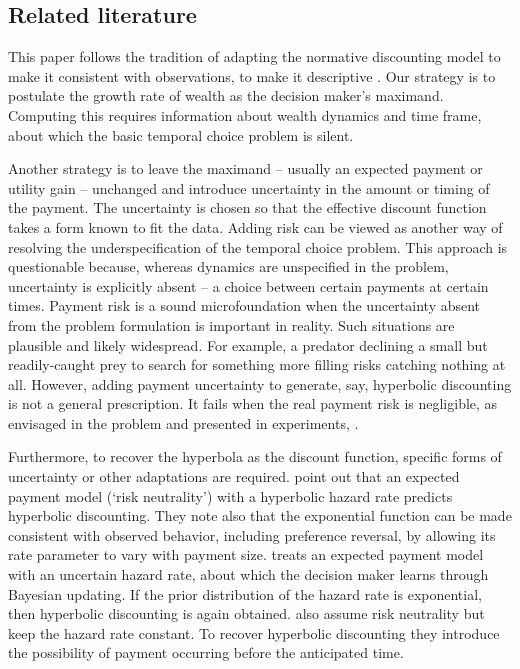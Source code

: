 \subsection{Related literature\label{sec:literature}}

This paper follows the tradition of adapting the normative discounting model to make it consistent with observations, \ie to make it descriptive \citep{Kacelnik1997}. Our strategy is to postulate the growth rate of wealth as the decision maker's maximand. Computing this requires information about wealth dynamics and time frame, about which the basic temporal choice problem is silent.

Another strategy is to leave the maximand -- usually an expected payment or utility gain -- unchanged and introduce uncertainty in the amount or timing of the payment. The uncertainty is chosen so that the effective discount function takes a form known to fit the data. Adding risk can be viewed as another way of resolving the underspecification of the temporal choice problem. This approach is questionable because, whereas dynamics are unspecified in the problem, uncertainty is explicitly absent -- a choice between certain payments at certain times. Payment risk is a sound microfoundation when the uncertainty absent from the problem formulation is important in reality. Such situations are plausible and likely widespread. For example, a predator declining a small but readily-caught prey to search for something more filling risks catching nothing at all. However, adding payment uncertainty to generate, say, hyperbolic discounting is not a general prescription. It fails when the real payment risk is negligible, as envisaged in the problem and presented in experiments, \eg \citep{MyersonGreen1995}.

Furthermore, to recover the hyperbola as the discount function, specific forms of uncertainty or other adaptations are required. \citet{GreenMyerson1996} point out that an expected payment model (`risk neutrality') with a hyperbolic hazard rate predicts hyperbolic discounting. They note also that the exponential function can be made consistent with observed behavior, including preference reversal, by allowing its rate parameter to vary with payment size. \citet{Sozou1998} treats an expected payment model with an uncertain hazard rate, about which the decision maker learns through Bayesian updating. If the prior distribution of the hazard rate is exponential, then hyperbolic discounting is again obtained. \citet{dasgupta2005uncertainty} also assume risk neutrality but keep the hazard rate constant. To recover hyperbolic discounting they introduce the possibility of payment occurring before the anticipated time.

